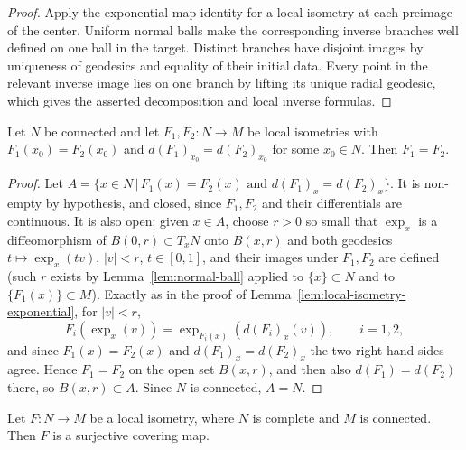 \begin{proof}
\sketch
{}
Apply the exponential-map identity for a local isometry at each preimage of the center. Uniform normal balls make the corresponding inverse branches well defined on one ball in the target. Distinct branches have disjoint images by uniqueness of geodesics and equality of their initial data. Every point in the relevant inverse image lies on one branch by lifting its unique radial geodesic, which gives the asserted decomposition and local inverse formulas.
\end{proof}

\begin{lemma}
\label{lem:local-isometry-rigidity}
\leanok

Let $N$ be connected and let $F_1,F_2\colon N\to M$ be local
isometries with $F_1(x_0)=F_2(x_0)$ and $d(F_1)_{x_0}=d(F_2)_{x_0}$
for some $x_0\in N$. Then $F_1=F_2$.
\end{lemma}

\begin{proof}
  \leanok
\sketch
{}
Let $A=\{x\in N\,|\, F_1(x)=F_2(x)\text{ and }
d(F_1)_x=d(F_2)_x\}$. It is non-empty by hypothesis, and closed,
since $F_1,F_2$ and their differentials are continuous. It is also
open: given $x\in A$, choose $r>0$ so small that $\exp_x$ is a
diffeomorphism of $B(0,r)\subset T_xN$ onto $B(x,r)$ and both
geodesics $t\mapsto\exp_x(tv)$, $|v|<r$, $t\in[0,1]$, and their
images under $F_1,F_2$ are defined (such $r$ exists by
Lemma~\ref{lem:normal-ball} applied to $\{x\}\subset N$ and to
$\{F_1(x)\}\subset M$). Exactly as in the proof of
Lemma~\ref{lem:local-isometry-exponential}, for $|v|<r$,
$$F_i\left(\exp_x(v)\right)=\exp_{F_i(x)}\left(d(F_i)_x
(v)\right),\qquad i=1,2,$$
and since $F_1(x)=F_2(x)$ and $d(F_1)_x=d(F_2)_x$ the two right-hand
sides agree. Hence $F_1=F_2$ on the open set $B(x,r)$, and then also
$d(F_1)=d(F_2)$ there, so $B(x,r)\subset A$. Since $N$ is connected,
$A=N$.
\end{proof}

\begin{lemma}
\label{lem:local-isometry-covering}

Let $F\colon N\to M$ be a local isometry, where $N$ is complete and
$M$ is connected. Then $F$ is a surjective covering map.
\end{lemma}

